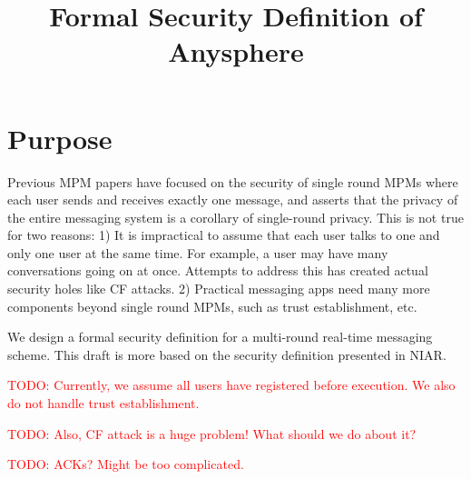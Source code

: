 \documentclass[sigconf, nonacm, balance=false, natbib=false, screen]{acmart}
\title{Formal Security Definition of Anysphere}
\newcommand\todo[1]{\textcolor{red}{TODO: #1}}
\begin{document}
\maketitle
\section{Purpose}
Previous MPM papers have focused on the security of single round MPMs where each user sends and receives exactly one message, and asserts that the privacy of the entire messaging system is a corollary of single-round privacy. This is not true for two reasons: 1) It is impractical to assume that each user talks to one and only one user at the same time. For example, a user may have many conversations going on at once. Attempts to address this has created actual security holes like CF attacks. 2) Practical messaging apps need many more components beyond single round MPMs, such as trust establishment, etc.

We design a formal security definition for a multi-round real-time messaging scheme. This draft is more based on the security definition presented in NIAR. 

\todo{Currently, we assume all users have registered before execution. We also do not handle trust establishment.}

\todo{Also, CF attack is a huge problem! What should we do about it?}

\todo{ACKs? Might be too complicated.}
\end{document}
